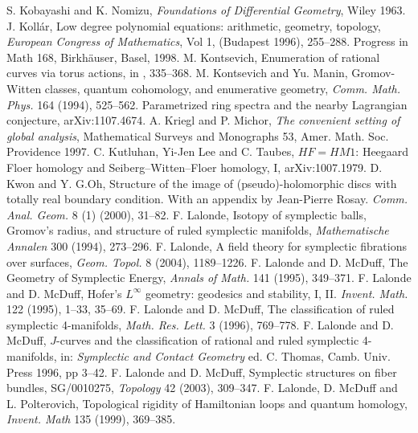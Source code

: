  S. Kobayashi and K. Nomizu, \emph{Foundations of Differential Geometry}, Wiley 1963.
 J. Koll\'ar, Low degree polynomial equations: arithmetic, geometry, topology, \emph{European Congress of Mathematics}, Vol 1, (Budapest 1996), 255--288. Progress in Math 168, Birkhäuser, Basel, 1998.
 M. Kontsevich, Enumeration of rational curves via torus actions, in \cite{src-80}, 335--368.
 M. Kontsevich and Yu. Manin, Gromov-Witten classes, quantum cohomology, and enumerative geometry, \emph{Comm. Math. Phys.} 164 (1994), 525--562.
 Parametrized ring spectra and the nearby Lagrangian conjecture, arXiv:1107.4674.
 A. Kriegl and P. Michor, \emph{The convenient setting of global analysis}, Mathematical Surveys and Monographs 53, Amer. Math. Soc. Providence 1997.
 C. Kutluhan, Yi-Jen Lee and C. Taubes, $HF=HM1$: Heegaard Floer homology and Seiberg--Witten--Floer homology, I, arXiv:1007.1979.
 D. Kwon and Y. G.Oh, Structure of the image of (pseudo)-holomorphic discs with totally real boundary condition. With an appendix by Jean-Pierre Rosay. \emph{Comm. Anal. Geom.} 8 (1) (2000), 31--82.
 F. Lalonde, Isotopy of symplectic balls, Gromov's radius, and structure of ruled symplectic manifolds, \emph{Mathematische Annalen} 300 (1994), 273--296.
 F. Lalonde, A field theory for symplectic fibrations over surfaces, \emph{Geom. Topol.} 8 (2004), 1189--1226.
 F. Lalonde and D. McDuff, The Geometry of Symplectic Energy, \emph{Annals of Math.} 141 (1995), 349--371.
 F. Lalonde and D. McDuff, Hofer's $L^\infty$ geometry: geodesics and stability, I, II. \emph{Invent. Math.} 122 (1995), 1--33, 35--69.
 F. Lalonde and D. McDuff, The classification of ruled symplectic 4-manifolds, \emph{Math. Res. Lett.} 3 (1996), 769--778.
 F. Lalonde and D. McDuff, $J$-curves and the classification of rational and ruled symplectic 4-manifolds, in: \emph{Symplectic and Contact Geometry} ed. C. Thomas, Camb. Univ. Press 1996, pp 3--42.
 F. Lalonde and D. McDuff, Symplectic structures on fiber bundles, SG/0010275, \emph{Topology} 42 (2003), 309--347.
 F. Lalonde, D. McDuff and L. Polterovich, Topological rigidity of Hamiltonian loops and quantum homology, \emph{Invent. Math} 135 (1999), 369--385.
